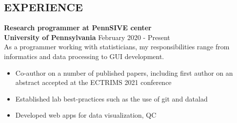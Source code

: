 \documentclass[margin]{res}
\begin{document}
\begin{resume}
\section{EXPERIENCE}
\textbf{Research programmer at PennSIVE center}\\
\textbf{University of Pennsylvania} \hfill        February 2020 - Present\\
As a programmer working with statisticians, my responsibilities range from informatics and data processing to GUI development. %
\begin{itemize}
    \item Co-author on a number of published papers, including first author on an abstract accepted at the ECTRIMS 2021 conference
    \item Established lab best-practices such as the use of git and datalad
    \item Developed web apps for data visualization, QC
\end{itemize}


\end{resume}
\end{document}
